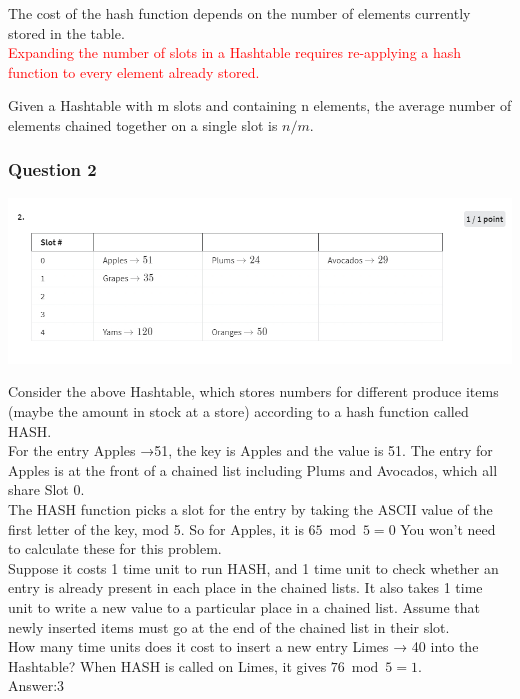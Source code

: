 \documentclass{article}
\begin{document}
The cost of the hash function depends on the number of elements currently stored in the table.\\


\textcolor{red}{Expanding the number of slots in a Hashtable requires re-applying a hash function to every element already stored.\\}

Given a Hashtable with m slots and containing n elements, the average number of elements chained together on a single slot is $n/m$.\\


\subsubsection{Question 2}

\includegraphics[width=\textwidth]{hashtablequestion2.png}

Consider the above Hashtable, which stores numbers for different produce items (maybe the amount in stock at a store) according to a hash function called HASH.\\

For the entry Apples →51, the key is Apples and the value is 51.  
The entry for Apples is at the front of a chained list including Plums and Avocados, which all share Slot 0.\\

The HASH function picks a slot for the entry by taking the ASCII value of the first letter of the key, mod 5. So for Apples, it is 
$65\bmod5=0$ You won't need to calculate these for this problem.\\

Suppose it costs 1 time unit to run HASH, and 1 time unit to check whether an entry is already present in each place in the chained lists.  
It also takes 1 time unit to write a new value to a particular place in a chained list.  
Assume that newly inserted items must go at the end of the chained list in their slot.\\


How many time units does it cost to insert a new entry Limes → 40 into the Hashtable?  When HASH is called on Limes, it gives $76 \bmod 5 = 1$.\\

Answer:3\\
\end{document}
